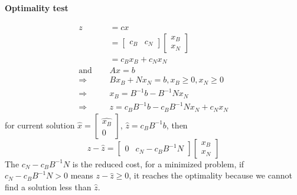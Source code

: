             \paragraph{Optimality test}
                \begin{align}
                    z &= cx \nonumber\\
                    & = \left[\begin{matrix}c_B & c_N\end{matrix} \right] \left [ \begin{matrix}x_B \\ x_N \end{matrix} \right] \nonumber \\
                    & = c_B x_B + c_N x_N \nonumber \\
                \text{and } \quad& Ax=b \nonumber \\
                    \Rightarrow & Bx_B + Nx_N = b, x_B\ge 0, x_N\ge 0\nonumber \\
                    \Rightarrow & x_B = B^{-1}b-B^{-1}Nx_N\nonumber \\
                    \Rightarrow & z = c_BB^{-1}b-c_BB^{-1}Nx_N+c_Nx_N\nonumber
                \end{align}
                for current solution $\hat{x}=\left [\begin{matrix}\hat{x_B} \\ 0\end{matrix}\right]$, $\hat{z} = c_BB^{-1}b$, then
                \begin{equation}
                    z - \hat{z} = \left[\begin{matrix}0 & c_N - c_BB^{-1}N \end{matrix} \right] \left[ \begin{matrix}x_B \\ x_N \end{matrix}\right] \nonumber
                \end{equation}
                The $c_N - c_BB^{-1}N$ is the reduced cost, for a minimized problem, if $c_N - c_BB^{-1}N > 0$ means $z - \hat{z} \ge 0$, it reaches the optimality because we cannot find a solution less than $\hat{z}$.
                            

